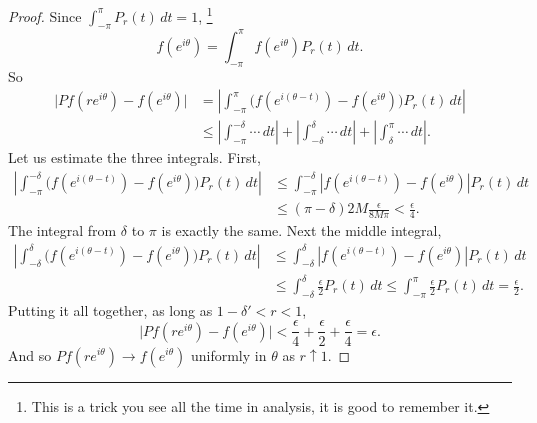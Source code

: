 \documentclass[12pt,openany]{book}
\newcommand{\sabs}[1]{\lvert {#1} \rvert}
\newcommand{\abs}[1]{\left\lvert {#1} \right\rvert}
\theoremstyle{plain}
\theoremstyle{remark}
\theoremstyle{definition}
\theoremstyle{exercise}
\theoremstyle{example}
\begin{document}
\begin{proof}
Since
$\int_{-\pi}^\pi P_r(t) \, dt = 1$,%
\footnote{This is a trick you see all the time in analysis, it is good to
remember it.}
\begin{equation*}
f(e^{i\theta})=
\int_{-\pi}^\pi f(e^{i\theta}) P_r(t) \, dt .
\end{equation*}
So
\begin{equation*}
\begin{split}
\sabs{
Pf(r e^{i\theta} ) - f(e^{i\theta})
}
& =
\abs{
\int_{-\pi}^{\pi} \bigl( f(e^{i(\theta-t)})-f(e^{i\theta}) \bigr) P_r(t) \, dt
}
\\
& \leq 
\abs{
\int_{-\pi}^{-\delta} \cdots \, dt
}
+
\abs{
\int_{-\delta}^{\delta} \cdots \, dt
}
+
\abs{
\int_{\delta}^\pi \cdots \, dt
} .
\end{split}
\end{equation*}
Let us estimate the three integrals.
First,
\begin{equation*}
\begin{split}
\abs{
\int_{-\pi}^{-\delta} \bigl( f(e^{i(\theta-t)})-f(e^{i\theta}) \bigr) P_r(t) \, dt
}
& \leq
\int_{-\pi}^{-\delta} \abs{ f(e^{i(\theta-t)})-f(e^{i\theta}) }
P_r(t) \, dt
\\
& \leq (\pi-\delta) 2M \frac{\epsilon}{8M\pi} < \frac{\epsilon}{4} .
\end{split}
\end{equation*}
The integral from $\delta$ to $\pi$ is exactly the same.
Next the middle integral,
\begin{equation*}
\begin{split}
\abs{
\int_{-\delta}^{\delta} \bigl( f(e^{i(\theta-t)})-f(e^{i\theta}) \bigr) P_r(t) \, dt
}
& \leq
\int_{-\delta}^{\delta} \abs{f(e^{i(\theta-t)})-f(e^{i\theta})}
P_r(t) \, dt
\\
& \leq
\int_{-\delta}^{\delta} \frac{\epsilon}{2} P_r(t) \, dt
\leq
\int_{-\pi}^{\pi} \frac{\epsilon}{2} P_r(t) \, dt
=\frac{\epsilon}{2} .
\end{split}
\end{equation*}
Putting it all together, as long as $1-\delta' < r < 1$,
\begin{equation*}
\sabs{
Pf(r e^{i\theta} ) - f(e^{i\theta})
} < \frac{\epsilon}{4} + \frac{\epsilon}{2} + \frac{\epsilon}{4} =
\epsilon.
\end{equation*}
And so $Pf(re^{i\theta}) \to f(e^{i\theta})$ uniformly in $\theta$
as $r \uparrow 1$.


\end{proof}
\end{document}
